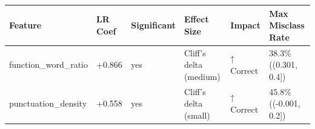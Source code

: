 \begin{tabular}{llllll}
\toprule
Feature & LR Coef & Significant & Effect Size & Impact & Max Misclass Rate \\
\midrule
function\_word\_ratio & +0.866 & yes & Cliff's delta (medium) & ↑ Correct & 38.3\% ((0.301, 0.4]) \\
punctuation\_density & +0.558 & yes & Cliff's delta (small) & ↑ Correct & 45.8\% ((-0.001, 0.2]) \\
\bottomrule
\end{tabular}
